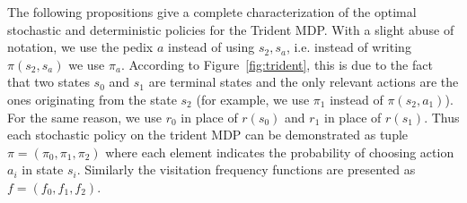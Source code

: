 The following propositions give a complete characterization of the optimal stochastic and deterministic policies for the Trident MDP. With a slight abuse of notation, we use the pedix $a$ instead of using $s_2,s_a$, i.e. instead of writing $\pi(s_2, s_a)$ we use $\pi_a$. According to Figure~\ref{fig:trident}, this is due to the fact that two states $s_0$ and $s_1$ are terminal states and the only relevant actions are the ones originating from the state $s_2$ (for example, we use $\pi_1$ instead of $\pi(s_2, a_1)$). For the same reason, we use $r_{0}$ in place of $r(s_0)$ and $r_{1}$ in place of $r(s_1)$. Thus each stochastic policy on the trident MDP can be demonstrated as tuple $\pi = (\pi_0, \pi_1, \pi_2)$ where each element indicates the probability of choosing action $a_i$ in state $s_i$. Similarly the visitation frequency functions are presented as $f = (f_0, f_1, f_2)$.


